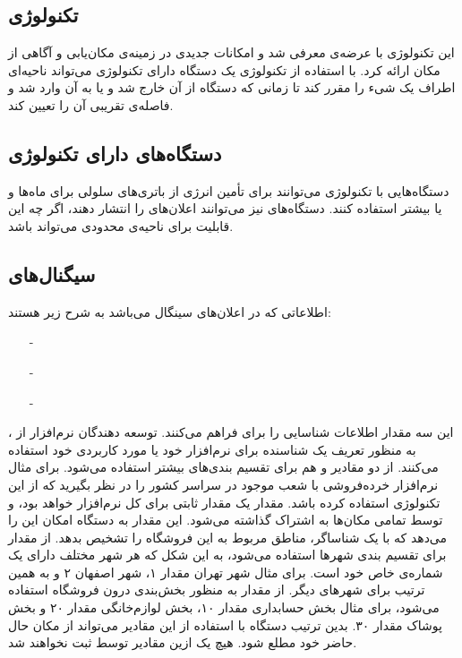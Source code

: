 \documentclass[oneside]{report}
\begin{document}
\subsection{ تکنولوژی    {\normalsize {}} }
این تکنولوژی با عرضه‌ی 
	 		{\normalsize {}} 
معرفی شد و امکانات جدیدی در زمینه‌ی مکان‌یابی و آگاهی از مکان ارائه کرد. با استفاده از تکنولوژی 
	 		{\normalsize {}} 
یک دستگاه دارای تکنولوژی
	 		{\normalsize {}}
	می‌تواند ناحیه‌ای اطراف یک شیء را مقرر کند تا زمانی که دستگاه 
		 		{\normalsize {}}
	از آن خارج شد و یا به آن وارد شد و فاصله‌ی تقریبی آن را تعیین کند. 
	
	 \subsection{دستگاه‌های دارای تکنولوژی    {\normalsize {}} } 
دستگاه‌هایی با تکنولوژی 
	 		{\normalsize {}}
	 		می‌توانند برای تأمین انرژی از باتری‌های سلولی برای ماه‌ها و یا بیشتر استفاده کنند. دستگاه‌های 
	 			 		{\normalsize {}} 
	 			 		نیز می‌توانند اعلان‌های 
	 			 			 		{\normalsize {}}
	 			 			 		را انتشار دهند، اگر چه این قابلیت برای ناحیه‌ی محدودی می‌تواند باشد. 
	 			 			 		
	\subsection{سیگنال‌های {\normalsize {}}} 			 			 		
	اطلاعاتی که در اعلان‌های سینگال 
		 		{\normalsize {}}
		 		می‌باشد به شرح زیر هستند:  			 			 		
	\begin{itemize}
		\item[-] 	{\normalsize {}}
		\item[-] 	{\normalsize {}}
		\item[-]	{\normalsize {}}
	\end{itemize}
 این سه مقدار اطلاعات شناسایی را برای 
 		 		{\normalsize {}}
 		 		فراهم می‌کنند.  توسعه دهندگان نرم‌افزار از 
 		 				 		{\normalsize {}}،  به منظور تعریف یک شناسنده برای نرم‌افزار خود یا مورد کاربردی خود استفاده می‌کنند. 
از دو مقادیر 
		 		{\normalsize {}}
		 		و 
		 				 		{\normalsize {}}
		 				 		هم برای تقسیم بندی‌های بیشتر استفاده می‌شود. برای مثال نرم‌افزار خرده‌فروشی  با شعب موجود در سراسر کشور را در نظر بگیرید که از این تکنولوژی استفاده کرده باشد. مقدار 
		 				 		{\normalsize {}}
یک مقدار ثابتی برای کل نرم‌افزار خواهد بود، و توسط تمامی مکان‌ها به اشتراک گذاشته می‌شود. این مقدار به دستگاه 
{\normalsize {}}
امکان این را می‌دهد که با یک شناساگر، مناطق مربوط به این فروشگاه را تشخیص بدهد. از مقدار 
{\normalsize {}}
برای تقسیم بندی شهر‌ها استفاده می‌شود، به این شکل که هر شهر مختلف دارای یک شماره‌ی 
{\normalsize {}}
خاص خود است. برای مثال شهر تهران مقدار ۱،  شهر اصفهان ۲ و به همین ترتیب برای شهر‌های دیگر. از مقدار 
{\normalsize {}}
به منظور بخش‌بندی درون فروشگاه استفاده می‌شود، برای مثال بخش حسابداری مقدار ۱۰، بخش لوازم‌خانگی مقدار ۲۰ و بخش پوشاک مقدار ۳۰. بدین ترتیب دستگاه 
{\normalsize {}}
با استفاده از این مقادیر می‌تواند از مکان حال حاضر خود مطلع شود.	هیچ یک ازین مقادیر توسط 
{\normalsize {}}
ثبت نخواهند شد.				
\end{document}
